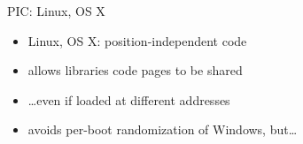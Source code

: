 \begin{frame}{PIC: Linux, OS X}
    \begin{itemize}
        \item Linux, OS X: position-independent code
        \item allows libraries code pages to be shared
        \item \ldots even if loaded at different addresses
        \vspace{.5cm}
        \item avoids per-boot randomization of Windows, but\ldots
    \end{itemize}
\end{frame}
